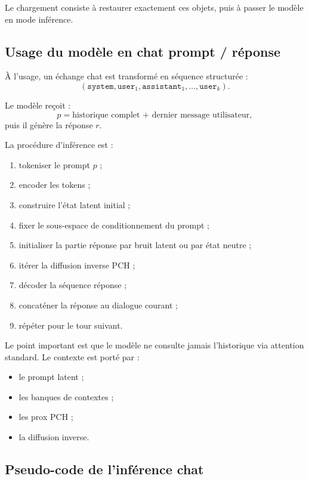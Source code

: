 \documentclass[11pt]{article}
\begin{document}
Le chargement consiste à restaurer exactement ces objets, puis à passer le modèle en mode inférence.

\subsection{Usage du modèle en chat prompt / réponse}

À l'usage, un échange chat est transformé en séquence structurée :
\[
(\texttt{system}, \texttt{user}_1, \texttt{assistant}_1, \dots, \texttt{user}_k).
\]

Le modèle reçoit :
\[
p = \text{historique complet + dernier message utilisateur},
\]
puis il génère la réponse \(r\).

La procédure d'inférence est :
\begin{enumerate}[leftmargin=2em]
    \item tokeniser le prompt \(p\) ;
    \item encoder les tokens ;
    \item construire l'état latent initial ;
    \item fixer le sous-espace de conditionnement du prompt ;
    \item initialiser la partie réponse par bruit latent ou par état neutre ;
    \item itérer la diffusion inverse PCH ;
    \item décoder la séquence réponse ;
    \item concaténer la réponse au dialogue courant ;
    \item répéter pour le tour suivant.
\end{enumerate}

Le point important est que le modèle ne consulte jamais l'historique via attention standard.  
Le contexte est porté par :
\begin{itemize}[leftmargin=2em]
    \item le prompt latent ;
    \item les banques de contextes ;
    \item les prox PCH ;
    \item la diffusion inverse.
\end{itemize}

\subsection{Pseudo-code de l'inférence chat}
\end{document}
